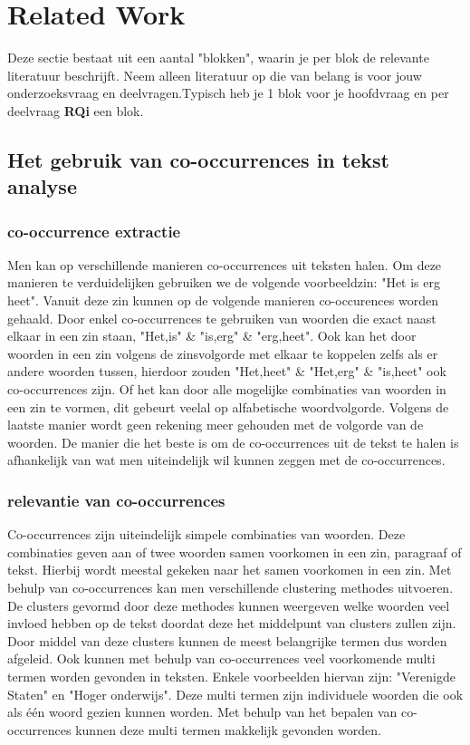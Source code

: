 \section{Related Work}
\label{sec:rel}

Deze sectie bestaat uit een aantal "blokken", waarin je per blok de relevante literatuur beschrijft. Neem alleen literatuur op die van belang is voor jouw onderzoeksvraag en deelvragen.Typisch heb je 1 blok voor je hoofdvraag en per deelvraag \textbf{RQi} een blok. 

\subsection{Het gebruik van co-occurrences in tekst analyse}

\subsubsection{co-occurrence extractie}
Men kan op verschillende manieren co-occurrences uit teksten halen. Om deze manieren te verduidelijken gebruiken we de volgende voorbeeldzin: "Het is erg heet". Vanuit deze zin kunnen op de volgende manieren co-occurences worden gehaald. Door enkel co-occurrences te gebruiken van woorden die exact naast elkaar in een zin staan, "Het,is" \& "is,erg" \& "erg,heet". Ook kan het door woorden in een zin volgens de zinsvolgorde met elkaar te koppelen zelfs als er andere woorden tussen, hierdoor zouden "Het,heet" \& "Het,erg" \& "is,heet" ook co-occurrences zijn. Of het kan door alle mogelijke combinaties van woorden in een zin te vormen, dit gebeurt veelal op alfabetische woordvolgorde. Volgens de laatste manier wordt geen rekening meer gehouden met de volgorde van de woorden. De manier die het beste is om de co-occurrences uit de tekst te halen is afhankelijk van wat men uiteindelijk wil kunnen zeggen met de co-occurrences. \citep{shimohata1997retrieving}

\subsubsection{relevantie van co-occurrences}
Co-occurrences zijn uiteindelijk simpele combinaties van woorden. Deze combinaties geven aan of twee woorden samen voorkomen in een zin, paragraaf of tekst. Hierbij wordt meestal gekeken naar het samen voorkomen in een zin. Met behulp van co-occurrences kan men verschillende clustering methodes uitvoeren. De clusters gevormd door deze methodes kunnen weergeven welke woorden veel invloed hebben op de tekst doordat deze het middelpunt van clusters zullen zijn. Door middel van deze clusters kunnen de meest belangrijke termen dus worden afgeleid. Ook kunnen met behulp van co-occurrences veel voorkomende multi termen worden gevonden in teksten. Enkele voorbeelden hiervan zijn: "Verenigde Staten" en "Hoger onderwijs". Deze multi termen zijn individuele woorden die ook als één woord gezien kunnen worden. Met behulp van het bepalen van co-occurrences kunnen deze multi termen makkelijk gevonden worden. 

